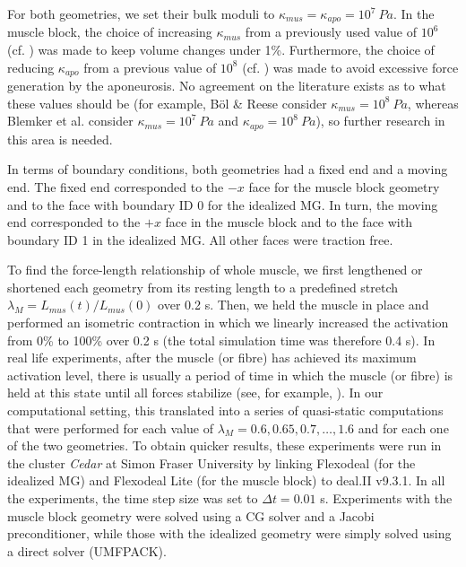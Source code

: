 \documentclass{sfuthesis}
\numberwithin{equation}{section}
\numberwithin{figure}{chapter}
\numberwithin{table}{chapter}
\theoremstyle{definition}
\begin{document}
For both geometries, we set their bulk moduli to $\kappa_{mus} = \kappa_{apo} = 10^7 \ \unit{Pa}$. In the muscle block, the choice of increasing $\kappa_{mus}$ from a previously used value of $10^6$ (cf. \cite{Paper3_RossEtAl2021,Paper2_RyanEtAl2020,Paper1_WakelingEtAl2020}) was made to keep volume changes under 1\%. Furthermore, the choice of reducing $\kappa_{apo}$ from a previous value of $10^8$ (cf. \cite{KonnoNigamWakeling2021_ECM, KonnoEtAl2022_CP}) was made to avoid excessive force generation by the aponeurosis. No agreement on the literature exists as to what these values should be (for example, B\"{o}l \& Reese \cite{BolReese2008} consider $\kappa_{mus} = 10^8 \ \unit{Pa}$, whereas Blemker et al. \cite{BlemkerPinskyDelp2005} consider $\kappa_{mus} = 10^7 \ \unit{Pa}$ and $\kappa_{apo} = 10^8 \ \unit{Pa}$), so further research in this area is needed.

In terms of boundary conditions, both geometries had a fixed end and a moving end. The fixed end corresponded to the $-x$ face for the muscle block geometry and to the face with boundary ID 0 for the idealized MG. In turn, the moving end corresponded to the $+x$ face in the muscle block and to the face with boundary ID 1 in the idealized MG. All other faces were traction free.

To find the force-length relationship of whole muscle, we first lengthened or shortened each geometry from its resting length to a predefined stretch $\lambda_M= L_{mus}(t)/L_{mus}(0)$ over 0.2 s. Then, we held the muscle in place and performed an isometric contraction in which we linearly increased the activation from 0\% to 100\% over 0.2 s (the total simulation time was therefore 0.4 s). In real life experiments, after the muscle (or fibre) has achieved its maximum activation level, there is usually a period of time in which the muscle (or fibre) is held at this state until all forces stabilize (see, for example, \cite{Gareis1992,HerzogLeonard2002}). In our computational setting, this translated into a series of quasi-static computations that were performed for each value of $\lambda_M = 0.6, 0.65, 0.7, \dots, 1.6$ and for each one of the two geometries. To obtain quicker results, these experiments were run in the cluster \textit{Cedar} at Simon Fraser University by linking Flexodeal (for the idealized MG) and Flexodeal Lite (for the muscle block) to deal.II v9.3.1. In all the experiments, the time step size was set to $\Delta t = 0.01$ s. Experiments with the muscle block geometry were solved using a CG solver and a Jacobi preconditioner, while those with the idealized geometry were simply solved using a direct solver (UMFPACK).
\end{document}
